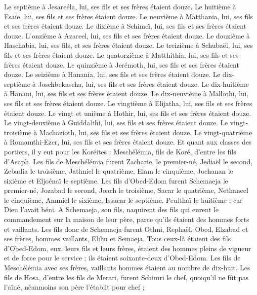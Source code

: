\begin{multicols}{2}
Le septième à Jesareéla, lui, ses fils et ses frères étaient douze.
Le huitième à Esaïe, lui, ses fils et ses frères étaient douze.
Le neuvième à Matthania, lui, ses fils et ses frères étaient douze.
Le dixième à Schimeï, lui, ses fils et ses frères étaient douze.
L'onzième à Azareel, lui, ses fils et ses frères étaient douze.
Le douzième à Haschabia, lui, ses fils, et ses frères étaient douze.
Le treizième à Schubaël, lui, ses fils et ses frères étaient douze.
Le quatorzième à Matthithia, lui, ses fils et ses frères étaient douze.
Le quinzième à Jerémoth, lui, ses fils et ses frères étaient douze.
Le seizième à Hanania, lui, ses fils et ses frères étaient douze.
Le dix-septième à Joschbekascha, lui, ses fils et ses frères étaient douze.
Le dix-huitième à Hanani, lui, ses fils et ses frères étaient douze.
Le dix-neuvième à Mallothi, lui, ses fils et ses frères étaient douze.
Le vingtième à Elijatha, lui, ses fils et ses frères étaient douze.
Le vingt et unième à Hothir, lui, ses fils et ses frères étaient douze.
Le vingt-deuxième à Guiddalthi, lui, ses fils et ses frères étaient douze.
Le vingt-troisième à Machazioth, lui, ses fils et ses frères étaient douze.
Le vingt-quatrième à Romamthi-Ezer, lui, ses fils et ses frères étaient douze.
\VerseOne{}Et quant aux classes des portiers, il y eut pour les Koréites : Meschélémia, fils de Koré, d'entre les fils d'Asaph.
Les fils de Meschélémia furent Zacharie, le premier-né, Jediaël le second, Zebadia le troisième, Jathniel le quatrième,
Elam le cinquième, Jochanan le sixième et Eljoénaï le septième.
Les fils d'Obed-Edom furent Schemaeja le premier-né, Jozabad le second, Joach le troisième, Sacar le quatrième, Nethaneel le cinquième,
Ammiel le sixième, Issacar le septième, Peulthaï le huitième ; car Dieu l'avait béni.
A Schemaeja, son fils, naquirent des fils qui eurent le commandement sur la maison de leur père, parce qu'ils étaient des hommes forts et vaillants.
Les fils donc de Schemaeja furent Othni, Rephaël, Obed, Elzabad et ses frères, hommes vaillants, Elihu et Semaeja.
Tous ceux-là étaient des fils d'Obed-Edom, eux, leurs fils et leurs frères, étaient des hommes pleins de vigueur et de force pour le service ; ils étaient soixante-deux d'Obed-Edom.
Les fils de Meschélémia avec ses frères, vaillants hommes étaient au nombre de dix-huit.
Les fils de Hosa, d'entre les fils de Merari, furent Schimri le chef, quoiqu'il ne fût pas l'aîné, néanmoins son père l'établit pour chef ;

\end{multicols}
